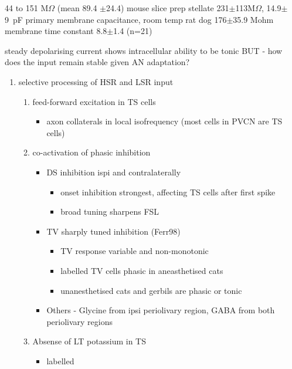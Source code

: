 44 to 151 M$\Omega $ (mean 89.4 {$\pm$}24.4) mouse slice prep \citep{FerragamoGoldingEtAl:1998a}
stellate 
231{$\pm$}113M$\Omega$, 14.9$\pm$9~pF primary membrane capacitance, room temp rat
\citep{IsaacsonWalmsley:1995} dog \citep{BalBaydasEtAl:2009} 
176{$\pm$}35.9 Mohm membrane time constant 8.8{$\pm$}1.4 (n=21)        

steady depolarising current shows intracellular ability to be tonic
\cite{Oertel:1983,OertelWuEtAl:1988} BUT - how does the input remain stable
given AN adaptation?



\begin{enumerate}
\item selective processing of HSR and LSR input
\begin{enumerate}
\item feed-forward excitation in TS cells
\begin{itemize}
\item axon collaterals in local isofrequency (most cells in PVCN are TS cells)
\end{itemize}
\item co-activation of phasic inhibition
\begin{itemize}
\item DS inhibition ispi and contralaterally
\begin{itemize}
\item onset inhibition strongest, affecting TS cells after first spike
\item broad tuning sharpens FSL
\end{itemize}
\item TV sharply tuned inhibition (Ferr98)
\begin{itemize}
\item TV response variable and non-monotonic
\item \citep{Rhode:1999}  labelled TV cells phasic in aneasthetised cats
\item unanesthetised cats and gerbils are phasic or tonic  \citep{DingVoigt:1997,ShofnerYoung:1985}
\end{itemize}
\item Others - Glycine from ipsi periolivary region, GABA from both
          periolivary regions \citep{AdamsWarr:1976,ShoreHelfertEtAl:1991,OstapoffBensonEtAl:1997}
\end{itemize}
\item Absense of LT potassium in TS
\begin{itemize}
\item labelled \citep{ManisMarx:1991,BalOertel:2001,FerragamoOertel:2002,CaoShatadalEtAl:2007}

\end{itemize}
\end{enumerate}
\end{enumerate}
